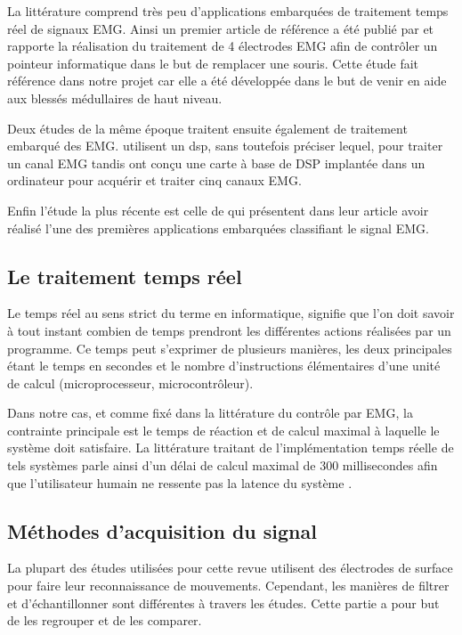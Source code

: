 \documentclass[letterpaper, twoside, 12pt, memoire, creativecommons, hyperref]{thETS}
\begin{document}
La littérature comprend très peu d'applications embarquées de traitement temps réel de signaux EMG. Ainsi un premier article de référence a été publié par \cite{Chang1996} et rapporte la réalisation du traitement de 4 électrodes EMG afin de contrôler un pointeur informatique dans le but de remplacer une souris. Cette étude fait référence dans notre projet car elle a été développée dans le but de venir en aide aux blessés médullaires de haut niveau. 

Deux études de la même époque traitent ensuite également de traitement embarqué des EMG. \cite{martinez1999} utilisent un dsp, sans toutefois préciser lequel, pour traiter un canal EMG tandis \cite{Prasad1996} ont conçu une carte à base de DSP implantée dans un ordinateur pour acquérir et traiter cinq canaux EMG.

Enfin l'étude la plus récente est celle de \cite{Tenore2007} qui présentent dans leur article avoir réalisé l'une des premières applications embarquées classifiant le signal EMG.

\subsection{Le traitement temps réel}

Le temps réel au sens strict du terme en informatique, signifie que l’on doit savoir à tout instant combien de temps prendront les différentes actions réalisées par un programme. Ce temps peut s'exprimer de plusieurs manières, les deux principales étant le temps en secondes et le nombre d'instructions élémentaires d'une unité de calcul (microprocesseur, microcontrôleur).

Dans notre cas, et comme fixé dans la littérature du contrôle par EMG, la contrainte principale est le temps de réaction et de calcul maximal à laquelle le système doit satisfaire. La littérature traitant de l’implémentation temps réelle de tels systèmes parle ainsi d’un délai de calcul maximal de 300 millisecondes afin que l’utilisateur humain ne ressente pas la latence du système \citep{Chu2007, Englehart2003}.

\subsection{Méthodes d'acquisition du signal}

La plupart des études utilisées pour cette revue utilisent des électrodes de surface pour faire leur reconnaissance de mouvements. Cependant, les manières de filtrer et d'échantillonner sont différentes à travers les études. Cette partie a pour but de les regrouper et de les comparer. 
\end{document}
